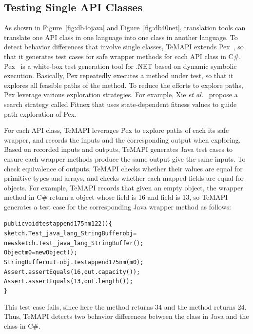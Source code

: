 \subsection{Testing Single API Classes}
\label{sec:approach:single}
As shown in Figure~\ref{fig:db4ojava} and Figure~\ref{fig:db40net}, translation tools can translate one API class in one language into one class in another language. To detect behavior differences that involve single classes, TeMAPI extends Pex~\cite{tillmann2008pex}, so that it generates test cases for safe wrapper methods for each API class in C\#. Pex~\cite{tillmann2008pex} is a white-box test generation tool for .NET based on dynamic symbolic execution. Basically, Pex repeatedly executes a method under test, so that it explores all feasible paths of the method. To reduce the efforts to explore paths, Pex leverage various exploration strategies. For example, Xie \emph{et al.}~\cite{xie09:fitness} propose a search strategy called Fitnex that uses state-dependent fitness values to guide path exploration of Pex. 

For each API class, TeMAPI leverages Pex to explore paths of each its safe wrapper, and records the inputs and the corresponding output when exploring. Based on recorded inputs and outputs, TeMAPI generates Java test cases to ensure each wrapper methods produce the same output give the same inputs. To check equivalence of  outputs, TeMAPI checks whether their values are equal for primitive types and arrays, and checks whether each mapped fields are equal for objects. For example, TeMAPI records that given an empty object, the  wrapper method in C\# return a  object whose  field is 16 and  field is 13, so TeMAPI generates a test case for the corresponding Java wrapper method as follows:

\begin{CodeOut}\vspace*{-1ex}
\begin{alltt}
public void testappend175nm122()\{
  sketch.Test_java_lang_StringBuffer obj =
      new sketch.Test_java_lang_StringBuffer();
  Object m0 = new Object();
  StringBuffer out = obj.testappend175nm(m0);
  Assert.assertEquals(16, out.capacity());	
  Assert.assertEquals(13, out.length());
\}
\end{alltt}
\end{CodeOut}\vspace*{-2ex}

This test case fails, since here the  method returns 34 and the  method returns 24. Thus, TeMAPI detects two behavior differences between the  class in Java and the  class in C\#.


